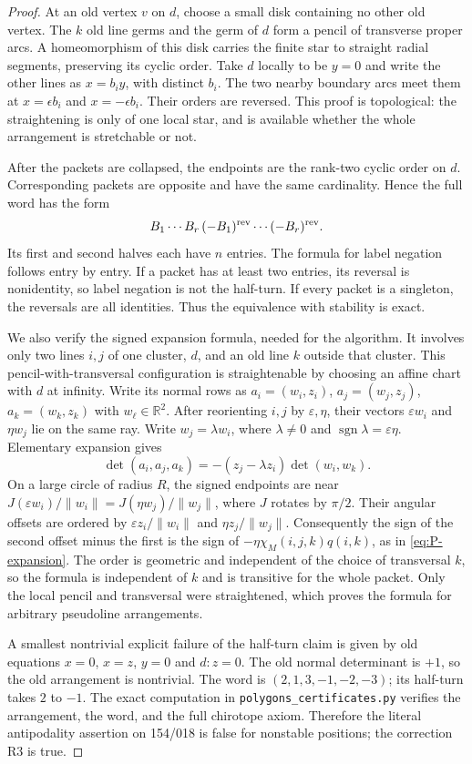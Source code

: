 \documentclass[11pt,a4paper]{article}
\begin{document}
\begin{proof}
At an old vertex $v$ on $d$, choose a small disk containing no other
old vertex.  The $k$ old line germs and the germ of $d$ form a pencil
of transverse proper arcs.  A homeomorphism of this disk carries
the finite star to straight radial segments, preserving its cyclic
order.  Take $d$ locally to be $y=0$ and write the other lines as
$x=b_i y$, with distinct $b_i$.  The two nearby boundary arcs meet
them at $x=\epsilon b_i$ and $x=-\epsilon b_i$.  Their orders are
reversed.  This proof is topological: the straightening is only of
one local star, and is available whether the whole arrangement is
stretchable or not.

After the packets are collapsed, the endpoints are the rank-two
cyclic order on $d$.  Corresponding packets are opposite and have
the same cardinality.  Hence the full word has the form
\[
       B_1\cdots B_r\,(-B_1)^{\rm rev}\cdots(-B_r)^{\rm rev}.
\]
Its first and second halves each have $n$ entries.  The formula for
label negation follows entry by entry.  If a packet has at least two
entries, its reversal is nonidentity, so label negation is not the
half-turn.  If every packet is a singleton, the reversals are all
identities.  Thus the equivalence with stability is exact.

We also verify the signed expansion formula, needed for the
algorithm.  It involves only two lines $i,j$ of one cluster, $d$,
and an old line $k$ outside that cluster.  This pencil-with-transversal
configuration is straightenable by choosing an affine chart with
$d$ at infinity.  Write its normal rows as $a_i=(w_i,z_i)$,
$a_j=(w_j,z_j)$, $a_k=(w_k,z_k)$ with $w_\ell\in\mathbb R^2$.
After reorienting $i,j$ by $\varepsilon,\eta$, their vectors
$\varepsilon w_i$ and $\eta w_j$ lie on the same ray. Write
$w_j=\lambda w_i$, where $\lambda\ne0$ and
$\operatorname{sgn}\lambda=\varepsilon\eta$. Elementary expansion gives
\[
 \det(a_i,a_j,a_k)=-(z_j-\lambda z_i)\det(w_i,w_k).
\]
On a large circle of radius $R$, the signed endpoints are near
$J(\varepsilon w_i)/\|w_i\|=J(\eta w_j)/\|w_j\|$, where $J$
rotates by $\pi/2$. Their angular offsets are ordered by
$\varepsilon z_i/\|w_i\|$ and $\eta z_j/\|w_j\|$.
Consequently the sign of the second offset minus the first is the sign of
$-\eta\chi_M(i,j,k)q(i,k)$, as in
\eqref{eq:P-expansion}.  The order is geometric and independent of
the choice of transversal $k$, so the formula is independent of $k$
and is transitive for the whole packet.  Only the local pencil and
transversal were straightened, which proves the formula for arbitrary
pseudoline arrangements.

A smallest nontrivial explicit failure of the half-turn claim is
given by old equations $x=0$, $x=z$, $y=0$ and $d:z=0$.  The old
normal determinant is $+1$, so the old arrangement is nontrivial.
The word is $(2,1,3,-1,-2,-3)$; its half-turn takes $2$ to $-1$.
The exact computation in \texttt{polygons\_certificates.py} verifies
the arrangement, the word, and the full chirotope axiom.  Therefore
the literal antipodality assertion on 154/018 is false for
nonstable positions; the correction R3 is true.
\end{proof}
\end{document}
